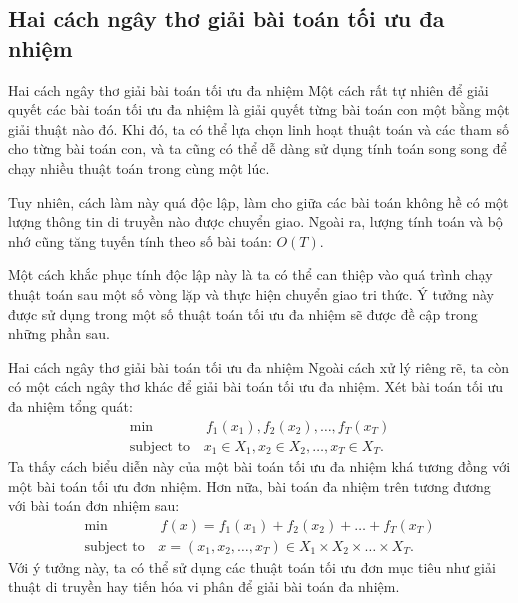 \subsection{Hai cách ngây thơ giải bài toán tối ưu đa nhiệm} %
\label{sub:Hai cách ngây thơ giải bài toán tối ưu đa nhiệm}

\begin{frame}{Hai cách ngây thơ giải bài toán tối ưu đa nhiệm}
  Một cách rất tự nhiên để giải quyết các bài toán tối ưu đa nhiệm là giải quyết
  từng bài toán con một bằng một giải thuật nào đó. Khi đó, ta có thể lựa chọn
  linh hoạt thuật toán và các tham số cho từng bài toán con, và ta cũng có thể
  dễ dàng sử dụng tính toán song song để chạy nhiều thuật toán trong cùng một
  lúc.

  Tuy nhiên, cách làm này quá độc lập, làm cho giữa các bài toán không hề có một
  lượng thông tin di truyền nào được chuyển giao. Ngoài ra, lượng tính toán và
  bộ nhớ cũng tăng tuyến tính theo số bài toán: \( O(T) \).

  Một cách khắc phục tính độc lập này là ta có thể can thiệp vào quá trình chạy
  thuật toán sau một số vòng lặp và thực hiện chuyển giao tri thức. Ý tưởng này
  được sử dụng trong một số thuật toán tối ưu đa nhiệm sẽ được đề cập trong
  những phần sau.
\end{frame}

\begin{frame}{Hai cách ngây thơ giải bài toán tối ưu đa nhiệm}
Ngoài cách xử lý riêng rẽ, ta còn có một cách ngây thơ khác để giải bài toán tối
ưu đa nhiệm. Xét bài toán tối ưu đa nhiệm tổng quát:
\begin{align*}
  \min &\, f_{1}(x_{1}), f_{2}(x_{2}), \ldots , f_{T}(x_{T})\\
  \text{subject to}\, &x_{1} \in X_{1}, x_{2} \in X_{2},
  \ldots , x_{T} \in X_{T}.
\end{align*}
Ta thấy cách biểu diễn này của một bài toán tối ưu đa nhiệm khá tương đồng với
một bài toán tối ưu đơn nhiệm. Hơn nữa, bài toán đa nhiệm trên tương đương với
bài toán đơn nhiệm sau:
\begin{align*}
  \min &\, f(x) = f_{1}(x_{1})+ f_{2}(x_{2})+ \ldots +
  f_{T}(x_{T})\\
  \text{subject to}\, &x = (x_{1}, x_{2}, \ldots, x_{T}) \in X_{1} \times  X_{2}
  \times  \ldots  \times X_{T}.
\end{align*}
Với ý tưởng này, ta có thể sử dụng các thuật toán tối ưu đơn mục tiêu như giải
thuật di truyền hay tiến hóa vi phân để giải bài toán đa nhiệm.
\end{frame}


